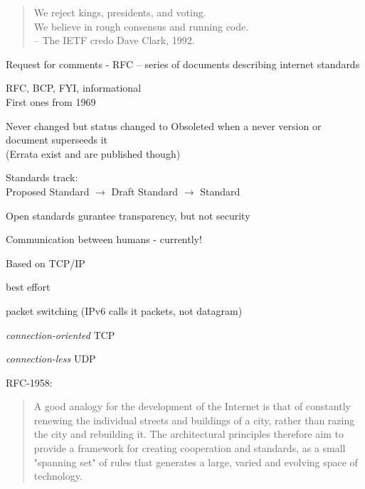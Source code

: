 \documentclass[Screen16to9,17pt]{foils}
\begin{document}

\begin{quote}
We reject kings, presidents, and voting.\\
We believe in rough consensus and running code.\\
-- The IETF credo Dave Clark, 1992.
\end{quote}

\begin{list2}
\item Request for comments - RFC -- series of documents describing internet standards
\item RFC, BCP, FYI, informational\\
First ones from 1969
\item Never changed but status changed to Obsoleted when a never version or document superseeds it\\
(Errata exist and are published though)
\item Standards track:\\
Proposed Standard $\rightarrow$ Draft Standard $\rightarrow$ Standard
\item  Open standards gurantee transparency, but not security
\end{list2}



\begin{list1}
\item Communication between humans - currently!
\item Based on TCP/IP
\begin{list2}
\item best effort
\item packet switching (IPv6 calls it packets, not datagram)
\item \emph{connection-oriented} TCP
\item \emph{connection-less} UDP
\end{list2}
\end{list1}

RFC-1958:
\begin{quote}
 A good analogy for the development of the Internet is that of
 constantly renewing the individual streets and buildings of a city,
 rather than razing the city and rebuilding it. The architectural
 principles therefore aim to provide a framework for creating
 cooperation and standards, as a small "spanning set" of rules that
 generates a large, varied and evolving space of technology.
\end{quote}
\end{document}
